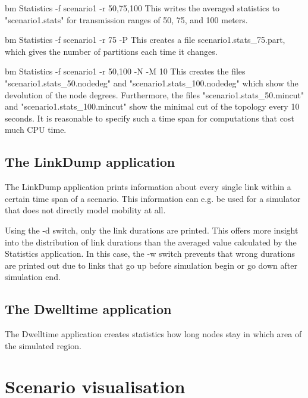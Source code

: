 \documentclass[11pt,a4paper,twoside,normalheadings,headsepline,DIV13,BCOR11mm,openright]{article}
\begin{document}
   bm Statistics -f scenario1 -r 50,75,100
\newline \newline
This  writes  the   averaged   statistics   to   "scenario1.stats"   for
transmission ranges of 50, 75, and 100 meters.
\newline

   bm Statistics -f scenario1 -r 75 -P
\newline \newline
This  creates  a file scenario1.stats\_75.part, which gives the number of
partitions each time it changes.
\newline

   bm Statistics -f scenario1 -r 50,100 -N -M 10
\newline \newline
This    creates    the    files     "scenario1.stats\_50.nodedeg"     and
"scenario1.stats\_100.nodedeg"  which  show  the  devolution  of the node
degrees.  Furthermore,   the   files   "scenario1.stats\_50.mincut"   and
"scenario1.stats\_100.mincut"  show the minimal cut of the topology every
10  seconds.  It  is  reasonable  to  specify  such  a  time  span   for
computations that cost much CPU time.


\subsection{The LinkDump application}


The  LinkDump  application  prints  information  about every single link
within a certain time span of a scenario. This information can  e.g.  be
used for a simulator that does not directly model mobility at all.

Using  the  -d  switch, only the link durations are printed. This offers
more insight into the distribution of link durations than  the  averaged
value  calculated  by  the  Statistics application. In this case, the -w
switch prevents that wrong durations are printed out due to  links  that
go up before simulation begin or go down after simulation end.


\subsection{The Dwelltime application}

The Dwelltime application creates statistics how long nodes stay in which 
area of the simulated region.


\section{Scenario visualisation}
\end{document}
